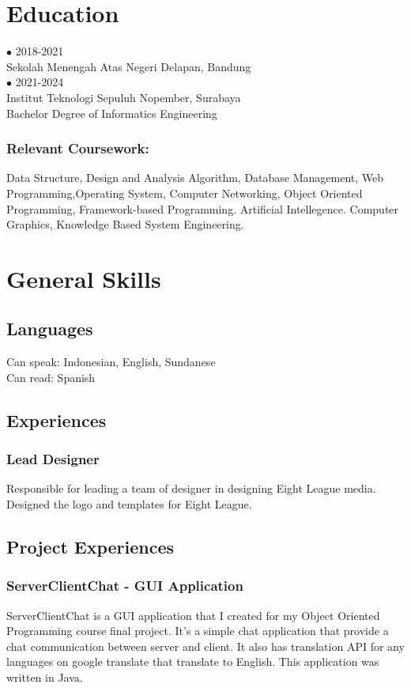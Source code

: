 \documentclass{article}
\begin{document}
\section{Education}
{\Large $ \bullet $ 2018-2021} \\
{Sekolah Menengah Atas Negeri Delapan, Bandung}
\\[2em]
{\Large $ \bullet $ 2021-2024} \\
{Institut Teknologi Sepuluh Nopember, Surabaya}
\\
{Bachelor Degree of Informatics Engineering}
\subsubsection{Relevant Coursework:}
Data Structure, Design and Analysis Algorithm, Database Management, Web Programming,Operating System, Computer Networking, Object Oriented Programming, Framework-based Programming. Artificial Intellegence. Computer Graphics, Knowledge Based System Engineering.

\section{General Skills}

\subsection{Languages}
Can speak: Indonesian, English, Sundanese \\
Can read: Spanish 

\subsection{Experiences}
\subsubsection{Lead Designer}
Responsible for leading a team of designer in designing Eight League media. Designed the logo and templates for Eight League.

\subsection{Project Experiences}
\subsubsection{ServerClientChat - GUI Application}
ServerClientChat is a GUI application that I created for my Object Oriented Programming course final project. It's a simple chat application 
that provide a chat communication between server and client. It also has translation API for any languages on google translate that translate to English. This application was written in Java.
\end{document}
